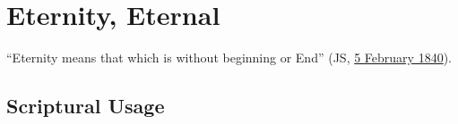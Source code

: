 \section{Eternity, Eternal}
	\label{ETERNITY}
	
	``Eternity means that which is without beginning or End'' (JS, \hyperref[ETERNITY-JS]{5 February 1840}).
	





\subsection{Scriptural Usage} %
	\label{ETERNITY-SCRIPTURES}

	
	
